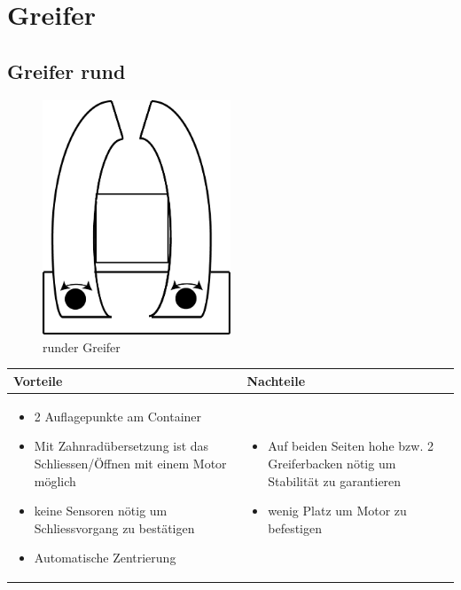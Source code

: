 
\section{Greifer}


\subsection{Greifer rund}
\begin{figure} [hbp]
	\centering
	\includegraphics[width=0.5\textwidth]{fig/Greifer_rund.png}
	\caption{runder Greifer}
\end{figure}


\begin{table}[h]
\begin{tabular}{p{} | p{}}


 \textbf{Vorteile} & \textbf{Nachteile} \\ \hline
	 
\begin{itemize}
\item 2 Auflagepunkte am Container
\item Mit Zahnradübersetzung ist das Schliessen/Öffnen mit einem Motor möglich
\item keine Sensoren nötig um Schliessvorgang zu bestätigen
\item Automatische Zentrierung
\end{itemize}

 
 &
 
\begin{itemize}
\item Auf beiden Seiten hohe bzw. 2 Greiferbacken nötig um Stabilität zu garantieren
\item wenig Platz um Motor zu befestigen
\end{itemize}

\end{tabular}
\end{table}

